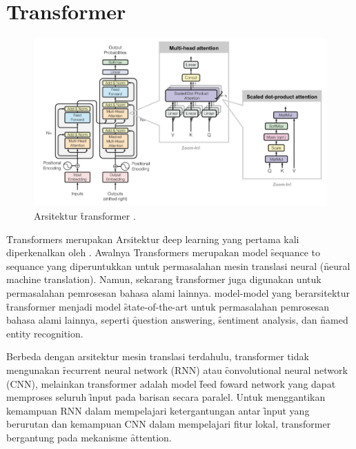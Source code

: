 \section{Transformer}
	\begin{figure}
		\centering
		\includegraphics[width=1\textwidth]{assets/pics/lilianweng-transformer.png}
		\caption{Arsitektur \f{transformer} \citep{weng2018attention}.}
		\label{fig:transformer}
	\end{figure}
	\f{Transformers} merupakan Arsitektur \f{deep learning} yang pertama kali diperkenalkan oleh \cite{transformerori}. Awalnya Transformers merupakan model \f{sequance to sequance} yang diperuntukkan untuk permasalahan mesin translasi neural (\f{neural machine translation}). Namun, sekarang \f{transformer} juga digunakan untuk permasalahan pemrosesan bahasa alami lainnya. model-model yang berarsitektur \f{transformer} menjadi model \f{state-of-the-art} untuk permasalahan pemrosesan bahasa alami lainnya, seperti \f{question answering}, \f{sentiment analysis}, dan \f{named entity recognition}.
 
	Berbeda dengan arsitektur mesin translasi terdahulu, transformer tidak mengunakan \f{recurrent neural network} (RNN) atau \f{convolutional neural network} (CNN), melainkan transformer adalah model \f{feed foward network} yang dapat memproses seluruh \f{input} pada barisan secara paralel. Untuk menggantikan kemampuan RNN dalam mempelajari ketergantungan antar \f{input} yang berurutan dan kemampuan CNN dalam mempelajari fitur lokal, transformer bergantung pada mekanisme \f{attention}.

